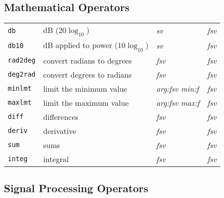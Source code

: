 \subsection{Mathematical Operators}

\begin{tabular}{p{.8in}p{2.5in}p{1.0in}p{.75in}}
{\tt db} & dB ($20 \log_{10}$) & {\it sv} & {\it fsv} \\
{\tt db10} & dB applied to power ($10 \log_{10}$) & {\it sv}
    & {\it fsv} \\
{\tt rad2deg} & convert radians to degrees & {\it fsv} & {\it fsv} \\
{\tt deg2rad} & convert degrees to radians & {\it fsv} & {\it fsv} \\
{\tt minlmt} & limit the minimum value & {\it arg:fsv \newline min:f}
    & {\it fsv} \\
{\tt maxlmt} & limit the maximum value & {\it arg:fsv \newline max:f}
    & {\it fsv} \\
{\tt diff} & differences & {\it fsv} & {\it fsv} \\
{\tt deriv} & derivative & {\it fsv} & {\it fsv} \\
{\tt sum} & sums & {\it fsv} & {\it fsv} \\
{\tt integ} & integral & {\it fsv} & {\it fsv}
\end{tabular}

\clearpage

\subsection{Signal Processing Operators}

